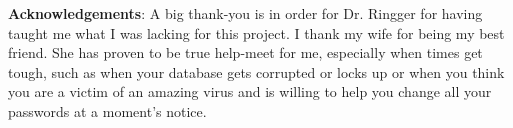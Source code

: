 \clearpage
\textbf{Acknowledgements}:
\label{acknowledgements}
A big thank-you is in order for Dr. Ringger for having taught me what I was lacking for this project. I thank my wife for being my best friend. She has proven to be true help-meet for me, especially when times get tough, such as when your database gets corrupted or locks up or when you think you are a victim of an amazing virus and is willing to help you change all your passwords at a moment's notice.
